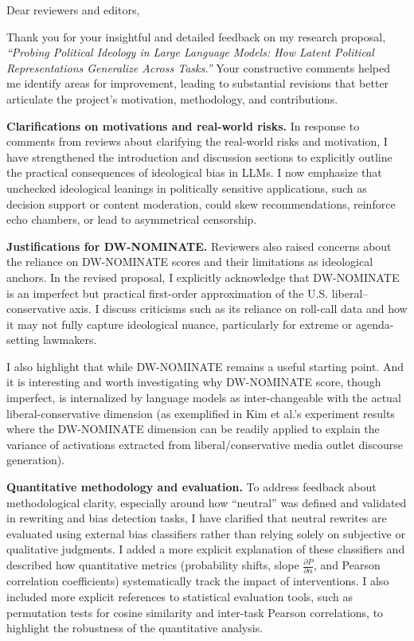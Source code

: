 \documentclass[11pt]{article}
\begin{document}
\noindent
Dear reviewers and editors,

\bigskip

Thank you for your insightful and detailed feedback on my research proposal, \emph{“Probing Political Ideology in Large Language Models: How Latent Political Representations Generalize Across Tasks.”} Your constructive comments helped me identify areas for improvement, leading to substantial revisions that better articulate the project’s motivation, methodology, and contributions.

\textbf{Clarifications on motivations and real-world risks.} In response to comments from reviews about clarifying the real-world risks and motivation, I have strengthened the introduction and discussion sections to explicitly outline the practical consequences of ideological bias in LLMs. I now emphasize that unchecked ideological leanings in politically sensitive applications, such as decision support or content moderation, could skew recommendations, reinforce echo chambers, or lead to asymmetrical censorship.

\textbf{Justifications for DW-NOMINATE.} Reviewers also raised concerns about the reliance on DW-NOMINATE scores and their limitations as ideological anchors. In the revised proposal, I explicitly acknowledge that DW-NOMINATE is an imperfect but practical first-order approximation of the U.S. liberal--conservative axis. I discuss criticisms such as its reliance on roll-call data and how it may not fully capture ideological nuance, particularly for extreme or agenda-setting lawmakers.

I also highlight that while DW-NOMINATE remains a useful starting point. And it is interesting and worth investigating why DW-NOMINATE score, though imperfect, is internalized by language models as inter-changeable with the actual liberal-conservative dimension (as exemplified in Kim et al.'s experiment results where the DW-NOMINATE dimension can be readily applied to explain the variance of activations extracted from liberal/conservative media outlet discourse generation).

\textbf{Quantitative methodology and evaluation.} To address feedback about methodological clarity, especially around how “neutral” was defined and validated in rewriting and bias detection tasks, I have clarified that neutral rewrites are evaluated using external bias classifiers rather than relying solely on subjective or qualitative judgments. I added a more explicit explanation of these classifiers and described how quantitative metrics (probability shifts, slope $\frac{\partial P}{\partial \alpha}$, and Pearson correlation coefficients) systematically track the impact of interventions. I also included more explicit references to statistical evaluation tools, such as permutation tests for cosine similarity and inter-task Pearson correlations, to highlight the robustness of the quantitative analysis.
\end{document}
